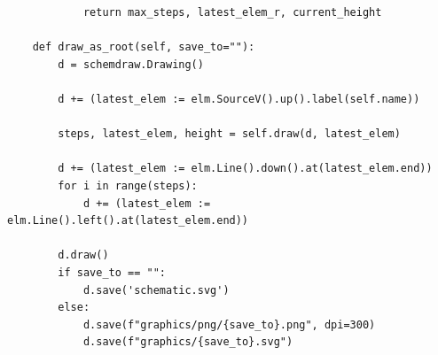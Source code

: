 \documentclass[a4paper,10pt,ngerman]{scrartcl}
\begin{document}
\begin{lstlisting}
            return max_steps, latest_elem_r, current_height

    def draw_as_root(self, save_to=""):
        d = schemdraw.Drawing()

        d += (latest_elem := elm.SourceV().up().label(self.name))

        steps, latest_elem, height = self.draw(d, latest_elem)

        d += (latest_elem := elm.Line().down().at(latest_elem.end))
        for i in range(steps):
            d += (latest_elem := elm.Line().left().at(latest_elem.end))

        d.draw()
        if save_to == "":
            d.save('schematic.svg')
        else:
            d.save(f"graphics/png/{save_to}.png", dpi=300)
            d.save(f"graphics/{save_to}.svg")

\end{lstlisting}
\end{document}
